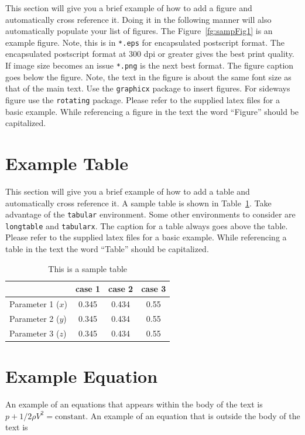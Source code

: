 This section will give you a brief example of how to add a figure and automatically cross reference it. Doing it in the following manner will also automatically populate your list of figures. The Figure~\ref{fg:sampFig1} is an example figure. Note, this is in \verb|*.eps| for encapsulated postscript format. The encapsulated postscript format at 300 dpi or greater gives the best print quality. If image size becomes an issue \verb|*.png| is the next best format. The figure caption goes below the figure. Note, the text in the figure is about the same font size as that of the main text. Use the \verb|graphicx| package to insert figures. For sideways figure use the \verb|rotating| package. Please refer to the supplied latex files for a basic example. While referencing a figure in the text the word ``Figure'' should be capitalized.



\section{Example Table}
This section will give you a brief example of how to add a table and automatically cross reference it. A sample table is shown in Table~\ref{tb:sampTab1}. Take advantage of the \verb|tabular| environment. Some other environments to consider are \verb|longtable| and \verb|tabularx|. The caption for a table always goes above the table. Please refer to the supplied latex files for a basic example. While referencing a table in the text the word ``Table'' should be capitalized.

\begin{table}[h]
\centering
\caption{This is a sample table} 
\begin{tabular}{ |l|c|c|c| } 
 \hline \hline
  & case 1 & case 2 & case 3 \\
 \hline \hline
 Parameter 1 ($x$) & 0.345 & 0.434 & 0.55  \\ 
 Parameter 2 ($y$) & 0.345 & 0.434 & 0.55  \\ 
 Parameter 3 ($z$) & 0.345 & 0.434 & 0.55  \\ 
 \hline
\end{tabular}
\label{tb:sampTab1}
\end{table}

\section{Example Equation}

An example of an equations that appears within the body of the text is $p+1/2 \rho V^2=\textrm{constant}$. An example of an equation that is outside the body of the text is

